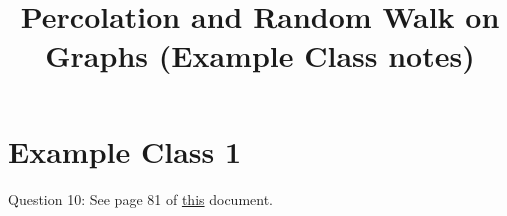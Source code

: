\documentclass[a4paper]{article}
\begin{document}
\title{Percolation and Random Walk on Graphs (Example Class notes)}

\maketitle

\newpage

\tableofcontents

\newpage

\section{Example Class 1}

Question 10: See page 81 of \href{https://moodle.epfl.ch/pluginfile.php/1671994/mod_resource/content/1/Chap8-9.pdf}{this} document.
\end{document}
